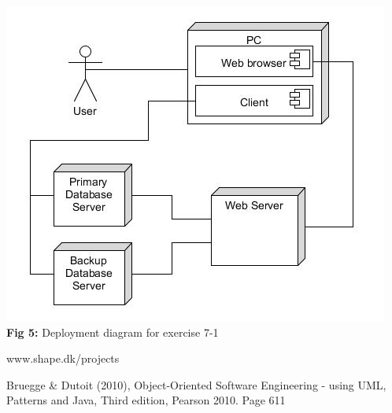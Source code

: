 \documentclass[12pt]{article}
\begin{document}
\includegraphics[scale=0.7]{7-1}\\
\textbf{Fig 5:} Deployment diagram for exercise 7-1







\newpage

\begin{thebibliography}{9}

  www.shape.dk/projects
  
Bruegge \& Dutoit (2010), Object-Oriented Software Engineering - using UML, Patterns and
Java, Third edition, Pearson 2010. Page 611 

\end{thebibliography}
\end{document}
